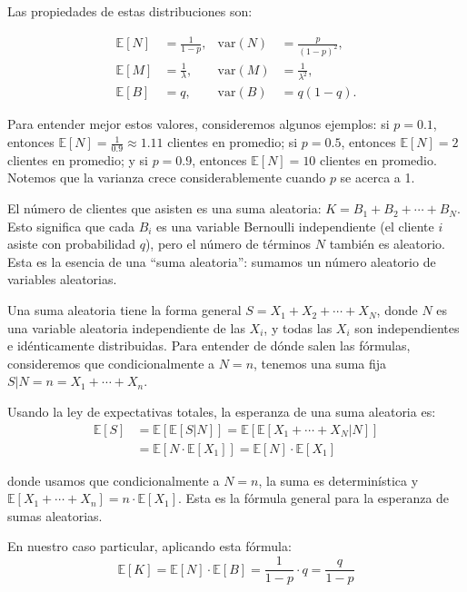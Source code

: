 \documentclass[
  11pt,
  letterpaper,
   addpoints,
  answers
  ]{exam}
\begin{document}
\begin{questions}
\begin{solution}
Las propiedades de estas distribuciones son:

\begin{align}
\mathbb{E}[N] &= \frac{1}{1-p}, & \text{var}(N) &= \frac{p}{(1-p)^2}, \\
\mathbb{E}[M] &= \frac{1}{\lambda}, & \text{var}(M) &= \frac{1}{\lambda^2}, \\
\mathbb{E}[B] &= q, & \text{var}(B) &= q(1-q).
\end{align}


Para entender mejor estos valores, consideremos algunos ejemplos: si $p = 0.1$, entonces $\mathbb{E}[N] = \frac{1}{0.9} \approx 1.11$ clientes en promedio; si $p = 0.5$, entonces $\mathbb{E}[N] = 2$ clientes en promedio; y si $p = 0.9$, entonces $\mathbb{E}[N] = 10$ clientes en promedio. Notemos que la varianza crece considerablemente cuando $p$ se acerca a 1.



El número de clientes que asisten es una suma aleatoria: $K = B_1 + B_2 + \cdots + B_N$. Esto significa que cada $B_i$ es una variable Bernoulli independiente (el cliente $i$ asiste con probabilidad $q$), pero el número de términos $N$ también es aleatorio. Esta es la esencia de una ``suma aleatoria'': sumamos un número aleatorio de variables aleatorias.

Una suma aleatoria tiene la forma general $S = X_1 + X_2 + \cdots + X_N$, donde $N$ es una variable aleatoria independiente de las $X_i$, y todas las $X_i$ son independientes e idénticamente distribuidas. Para entender de dónde salen las fórmulas, consideremos que condicionalmente a $N = n$, tenemos una suma fija $S|N=n = X_1 + \cdots + X_n$. 

Usando la ley de expectativas totales, la esperanza de una suma aleatoria es:
\begin{align}
\mathbb{E}[S] &= \mathbb{E}[\mathbb{E}[S|N]] = \mathbb{E}[\mathbb{E}[X_1 + \cdots + X_N | N]] \\
&= \mathbb{E}[N \cdot \mathbb{E}[X_1]] = \mathbb{E}[N] \cdot \mathbb{E}[X_1]
\end{align}

donde usamos que condicionalmente a $N = n$, la suma es determinística y $\mathbb{E}[X_1 + \cdots + X_n] = n \cdot \mathbb{E}[X_1]$. Esta es la fórmula general para la esperanza de sumas aleatorias.

En nuestro caso particular, aplicando esta fórmula:
\begin{equation}
\mathbb{E}[K] = \mathbb{E}[N] \cdot \mathbb{E}[B] = \frac{1}{1-p} \cdot q = \frac{q}{1-p}
\end{equation}


\end{solution}
\end{questions}
\end{document}
